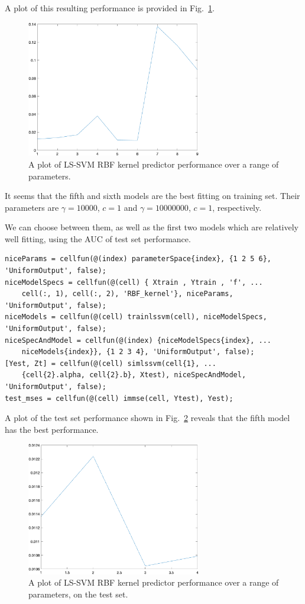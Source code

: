 \documentclass[10pt,a4paper]{article}
\begin{document}
A plot of this resulting performance is provided in Fig.~\ref{fig:crossvalidatedRBFSinc}.

\begin{figure}[h!]
\centering
  \includegraphics[width=3in]{crossvalidatedRBFSinc.png}
  \caption{A plot of LS-SVM RBF kernel predictor performance over a range of parameters.}
  \label{fig:crossvalidatedRBFSinc}
\end{figure}

It seems that the fifth and sixth models are the best fitting on training set. Their parameters are $\gamma=10000$, $c=1$ and $\gamma=10000000$, $c=1$, respectively.

We can choose between them, as well as the first two models which are relatively well fitting, using the AUC of test set performance.

\begin{lstlisting}[style=Matlab-editor, frame=single]
niceParams = cellfun(@(index) parameterSpace{index}, {1 2 5 6}, 'UniformOutput', false);
niceModelSpecs = cellfun(@(cell) { Xtrain , Ytrain , 'f', ...
    cell(:, 1), cell(:, 2), 'RBF_kernel'}, niceParams, 'UniformOutput', false);
niceModels = cellfun(@(cell) trainlssvm(cell), niceModelSpecs, 'UniformOutput', false);
niceSpecAndModel = cellfun(@(index) {niceModelSpecs{index}, ...
    niceModels{index}}, {1 2 3 4}, 'UniformOutput', false);
[Yest, Zt] = cellfun(@(cell) simlssvm(cell{1}, ...
    {cell{2}.alpha, cell{2}.b}, Xtest), niceSpecAndModel, 'UniformOutput', false);
test_mses = cellfun(@(cell) immse(cell, Ytest), Yest);
\end{lstlisting}

A plot of the test set performance shown in Fig.~\ref{fig:RBFtestsetPerf} reveals that the fifth model has the best performance.

\begin{figure}[h!]
\centering
  \includegraphics[width=3in]{RBFtestsetPerf.png}
  \caption{A plot of LS-SVM RBF kernel predictor performance over a range of parameters, on the test set.}
  \label{fig:RBFtestsetPerf}
\end{figure}
\end{document}
